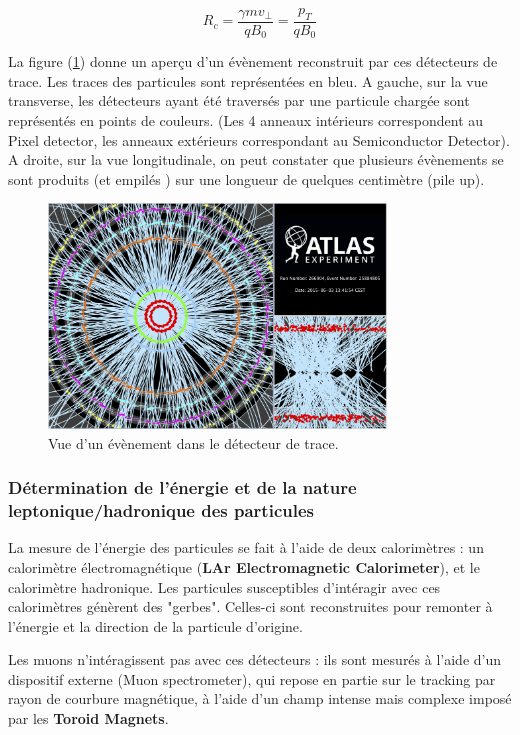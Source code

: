 \documentclass[11pt]{article} %
\begin{document}
\begin{equation} 
R_c = \dfrac{\gamma mv_{\perp}}{qB_0} = \dfrac{p_{T}}{qB_0}
\end{equation}

La figure (\ref{fig:atlas_event}) donne un aperçu d'un évènement reconstruit par ces détecteurs de trace. Les traces des particules sont représentées en bleu. A gauche, sur la vue transverse, les détecteurs ayant été traversés par une particule chargée sont représentés en points de couleurs.  (Les 4 anneaux intérieurs correspondent au Pixel detector, les anneaux extérieurs correspondant au  Semiconductor Detector). A droite, sur la vue longitudinale, on peut constater que plusieurs évènements se sont produits (et \og empilés \fg) sur une longueur de quelques centimètre (pile up).

\begin{figure}[H]
\centering
  \caption{Vue d'un évènement dans le détecteur de trace.}
\label{fig:atlas_event}
\includegraphics[width=0.8\textwidth]{../images/event.jpg}
\end{figure}


\subsubsection{Détermination de l'énergie et de la nature leptonique/hadronique des particules}

La mesure de l'énergie des particules se fait à l'aide de deux calorimètres : un calorimètre électromagnétique (\textbf{LAr Electromagnetic Calorimeter}), et le calorimètre hadronique. Les particules susceptibles d'intéragir avec ces calorimètres génèrent des "gerbes". Celles-ci sont reconstruites pour remonter à l'énergie et la direction de la particule d'origine.

Les muons n'intéragissent pas avec ces détecteurs : ils sont mesurés à l'aide d'un dispositif externe (Muon spectrometer), qui repose en partie sur le tracking par rayon de courbure magnétique, à l'aide d'un champ intense mais complexe imposé par les \textbf{Toroid Magnets}.
\end{document}
